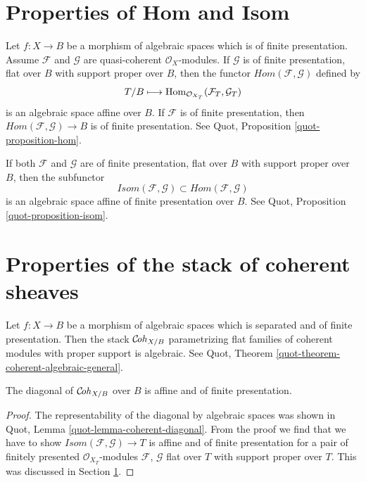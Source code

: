 \section{Properties of Hom and Isom}
\label{section-hom-isom}

\noindent
Let $f : X \to B$ be a morphism of algebraic spaces which is
of finite presentation. Assume $\mathcal{F}$ and $\mathcal{G}$
are quasi-coherent $\mathcal{O}_X$-modules.
If $\mathcal{G}$ is of finite presentation, flat over $B$
with support proper over $B$, then the functor
$\mathit{Hom}(\mathcal{F}, \mathcal{G})$ defined by
$$
T/B \longmapsto \mathop{\mathrm{Hom}}\nolimits_{\mathcal{O}_{X_T}}(\mathcal{F}_T, \mathcal{G}_T)
$$
is an algebraic space affine over $B$. If $\mathcal{F}$ is of
finite presentation, then
$\mathit{Hom}(\mathcal{F}, \mathcal{G}) \to B$
is of finite presentation. See
Quot, Proposition \ref{quot-proposition-hom}.

\medskip\noindent
If both $\mathcal{F}$ and $\mathcal{G}$ are of finite presentation,
flat over $B$ with support proper over $B$, then the subfunctor
$$
\mathit{Isom}(\mathcal{F}, \mathcal{G}) \subset
\mathit{Hom}(\mathcal{F}, \mathcal{G})
$$
is an algebraic space affine of finite presentation over $B$.
See Quot, Proposition \ref{quot-proposition-isom}.




\section{Properties of the stack of coherent sheaves}
\label{section-stack-coherent-sheaves}

\noindent
Let $f : X \to B$ be a morphism of algebraic spaces which is
separated and of finite presentation. Then the stack
$\mathcal{C}\!\mathit{oh}_{X/B}$ parametrizing flat families of coherent
modules with proper support is algebraic. See
Quot, Theorem \ref{quot-theorem-coherent-algebraic-general}.

\begin{lemma}
\label{lemma-coherent-diagonal-affine-fp}
The diagonal of $\mathcal{C}\!\mathit{oh}_{X/B}$ over $B$ is affine
and of finite presentation.
\end{lemma}

\begin{proof}
The representability of the diagonal by algebraic spaces
was shown in Quot, Lemma \ref{quot-lemma-coherent-diagonal}.
From the proof we find that we have to show
$\mathit{Isom}(\mathcal{F}, \mathcal{G}) \to T$
is affine and of finite presentation for a pair of
finitely presented $\mathcal{O}_{X_T}$-modules
$\mathcal{F}$, $\mathcal{G}$ flat over $T$ with support
proper over $T$. This was discussed in Section \ref{section-hom-isom}.
\end{proof}

